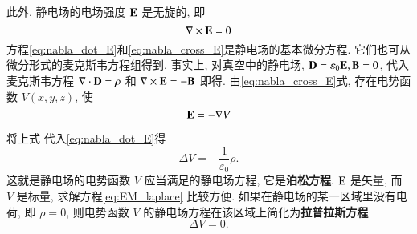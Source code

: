 此外, 静电场的电场强度 ${\mathbf{E}}$ 是无旋的, 即
\begin{equation}
    \nabla \times {\mathbf{E}}=0
    \label{eq:nabla_cross_E}
\end{equation}
方程\eqref{eq:nabla_dot_E}和\eqref{eq:nabla_cross_E}是静电场的基本微分方程. 它们也可从微分形式的麦克斯韦方程组得到. 
事实上, 对真空中的静电场, ${\mathbf{D}}=\varepsilon_0 {\mathbf{E}}, {\mathbf{B}}=0$, 代入麦克斯韦方程 
$\nabla \cdot {\mathbf{D}}=\rho$ 和 $\nabla \times {\mathbf{E}}=-{\mathbf{B}}$ 即得.
由\eqref{eq:nabla_cross_E}式, 存在电势函数 $V(x, y, z)$, 使
$$
{\mathbf{E}}=-\nabla V
$$

将上式 代入\eqref{eq:nabla_dot_E}得
\begin{equation}
    \Delta V=-\frac{1}{\varepsilon_0} \rho .
    \label{eq:EM_laplace}
\end{equation}
这就是静电场的电势函数 $V$ 应当满足的静电场方程, 它是\textbf{泊松方程}. ${\mathbf{E}}$ 是矢量, 而 $V$ 是标量, 求解方程\eqref{eq:EM_laplace} 比较方便.
如果在静电场的某一区域里没有电荷, 即 $\rho=0$, 则电势函数 $V$ 的静电场方程在该区域上简化为\textbf{拉普拉斯方程}
\begin{equation}
    \Delta V=0.
    \label{eq:EM_poisson}
\end{equation}
